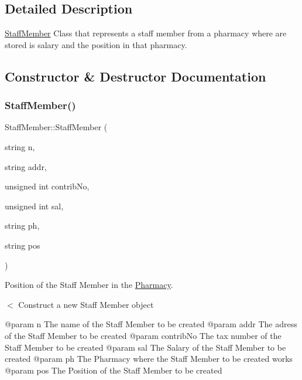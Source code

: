 \subsection{Detailed Description}
\hyperlink{classStaffMember}{Staff\+Member} Class that represents a staff member from a pharmacy where are stored is salary and the position in that pharmacy. 

\subsection{Constructor \& Destructor Documentation}
\mbox{\label{classStaffMember_a1e9921baaffb1e708b77f3488c78684b}} 
\subsubsection{\texorpdfstring{Staff\+Member()}{StaffMember()}\hspace{0.1cm}{\footnotesize\ttfamily [1/2]}}
{\footnotesize\ttfamily Staff\+Member\+::\+Staff\+Member (\begin{DoxyParamCaption}\item[{string}]{n,  }\item[{string}]{addr,  }\item[{unsigned int}]{contrib\+No,  }\item[{unsigned int}]{sal,  }\item[{string}]{ph,  }\item[{string}]{pos }\end{DoxyParamCaption})}



Position of the Staff Member in the \hyperlink{classPharmacy}{Pharmacy}. 

$<$ Construct a new Staff Member object \begin{DoxyVerb}@param n The name of the Staff Member to be created
@param addr The adress of the Staff Member to be created
@param contribNo The tax number of the Staff Member to be created
@param sal The Salary of the Staff Member to be created
@param ph The Pharmacy where the Staff Member to be created works
@param pos The Position of the Staff Member to be created\end{DoxyVerb}
 \mbox{\label{classStaffMember_ac29edb372cd676446075d72bbb0d7de6}} 
